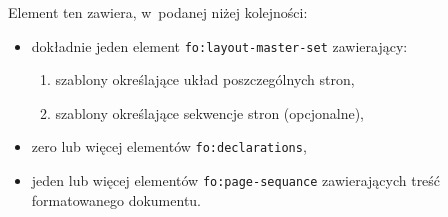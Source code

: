 \documentclass[a4paper]{article}
\begin{document}
Element ten zawiera, w~podanej niżej kolejności:
\begin{itemize} 
 \item dokładnie jeden element \texttt{fo:layout-master-set} zawierający:
 \begin{enumerate}
  \item szablony określające układ poszczególnych stron,
  \item szablony określające sekwencje stron (opcjonalne),
 \end{enumerate} 
 \item zero lub więcej elementów \texttt{fo:declarations},
 \item jeden lub więcej elementów \texttt{fo:page-sequance}
 zawierających treść formatowanego dokumentu.
\end{itemize}
\end{document}

